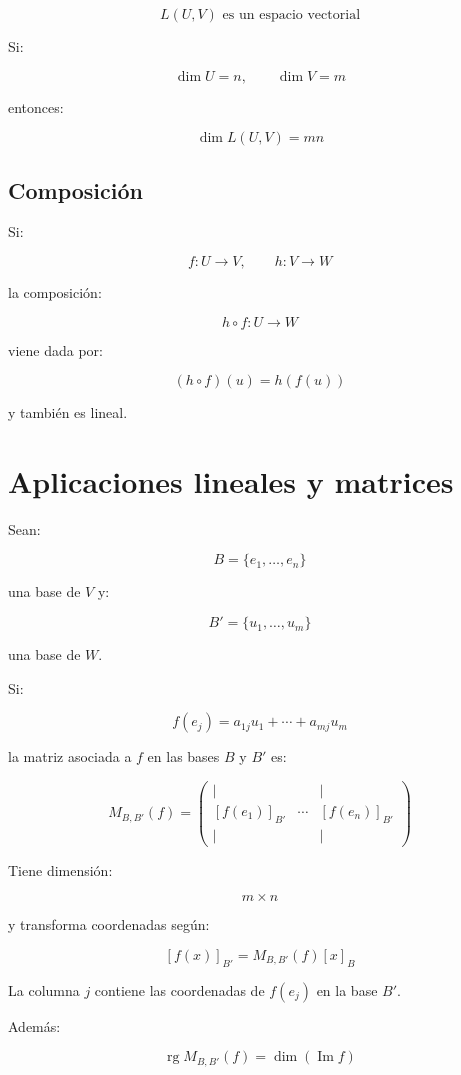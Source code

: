 \documentclass[11pt,a4paper]{article}
\newcommand{\Ima}{\operatorname{Im}}
\newcommand{\rg}{\operatorname{rg}}
\begin{document}
\[
\boxed{
L(U,V)
\text{ es un espacio vectorial}
}
\]

Si:

\[
\dim U=n,
\qquad
\dim V=m
\]

entonces:

\[
\boxed{
\dim L(U,V)=mn
}
\]

\subsection{Composición}

Si:

\[
f:U\longrightarrow V,
\qquad
h:V\longrightarrow W
\]

la composición:

\[
h\circ f:U\longrightarrow W
\]

viene dada por:

\[
(h\circ f)(u)=h(f(u))
\]

y también es lineal.

\section{Aplicaciones lineales y matrices}

Sean:

\[
B=\{e_1,\ldots,e_n\}
\]

una base de $V$ y:

\[
B'=\{u_1,\ldots,u_m\}
\]

una base de $W$.

Si:

\[
f(e_j)
=
a_{1j}u_1+\cdots+a_{mj}u_m
\]

la matriz asociada a $f$ en las bases $B$ y $B'$ es:

\[
\boxed{
M_{B,B'}(f)
=
\begin{pmatrix}
|&&|\\
[f(e_1)]_{B'}&\cdots&[f(e_n)]_{B'}\\
|&&|
\end{pmatrix}
}
\]

Tiene dimensión:

\[
m\times n
\]

y transforma coordenadas según:

\[
\boxed{
[f(x)]_{B'}
=
M_{B,B'}(f)[x]_B
}
\]

La columna $j$ contiene las coordenadas de $f(e_j)$ en la base $B'$.

Además:

\[
\boxed{
\rg M_{B,B'}(f)=\dim(\Ima f)
}
\]
\end{document}
